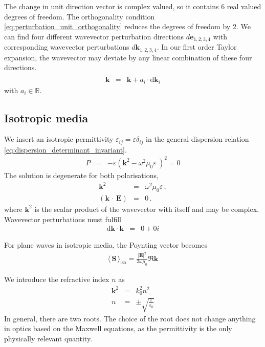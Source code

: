 \documentclass[12pt,a4paper,twoside,openright,BCOR10mm,headsepline,titlepage,abstracton,chapterprefix,final]{scrreprt}
\newcommand\Vector[1]{{\mathbf{#1}}}
\newcommand\vacuum{0}
\newcommand\wavenumber{k}
\newcommand\Wavevector{\Vector{\wavenumber}}
\newcommand{\scpm}[2]{(#1\,\cdot\,#2)}
\newcommand\scalarEfield{E}
\newcommand\Efield{\Vector{\scalarEfield}}
\newcommand\vacuumpermeability{\scalarpermeability_{\vacuum}}
\newcommand\scalarpermeability{\mu}
\newcommand\vacuumpermittivity{\scalarpermittivity_{\vacuum}}
\newcommand\scalarpermittivity{\varepsilon}
\newcommand{\timeavg}[1]{{\langle\,#1\,\rangle}}
\renewcommand\d{\textrm{d}}
\begin{document}
The change in unit direction vector is complex valued, so it contains 6 real valued degrees of freedom.
The orthogonality condition \eqref{eq:perturbation_unit_orthogonality} reduces the degrees of freedom by 2.
We can find four different wavevector perturbation directions $d\Vector{e}_{1,2,3,4}$
with corresponding wavevector perturbations $d \Wavevector_{1,2,3,4}$.
In our first order Taylor expansion, the wavevector may deviate by any linear combination of these four directions.
\begin{eqnarray}
 \tilde{\Wavevector} &=& \Wavevector + a_i \cdot \d \Wavevector_i \label{eq:perturbed_wavevector}
\end{eqnarray}
with $a_i \in \mathbb{R}$.


\subsection{Isotropic media}
We insert an isotropic permittivity $\scalarpermittivity_{ij} = \scalarpermittivity \delta_{ij}$ 
in the general dispersion relation \eqref{eq:dispersion_determinant_invariant}.
\begin{eqnarray}
 P &=& -\scalarpermittivity 
       \left( 
         \Wavevector^2 - \omega^2 \vacuumpermeability \scalarpermittivity\
       \right)^2
    = 0
\end{eqnarray}
The solution is degenerate for both polarisations,
\begin{eqnarray}
 \Wavevector^2 &=& \omega^2 \vacuumpermeability \scalarpermittivity\,, \\
 \scpm{\Wavevector}{\Efield} &=& 0\,.
\end{eqnarray}
where $\Wavevector^2$ is the scalar product of the wavevector with itself and may be complex.
Wavevector perturbations must fulfill
\begin{eqnarray}
 \d\Wavevector \cdot \Wavevector &=& 0 + 0i
\end{eqnarray}

For plane waves in isotropic media, the Poynting vector becomes 
\begin{eqnarray}
 \timeavg{\Vector{S}}_\text{iso} = \frac{ |\Efield|^2 }{ 2\omega\vacuumpermeability } \Re \Wavevector
\end{eqnarray}

We introduce the refractive index $n$ as
\begin{eqnarray}
 \Wavevector^2 &=& k_0^2 n^2 \\
 n &=& \pm \sqrt{ \frac{\scalarpermittivity}{\vacuumpermittivity} }
\end{eqnarray}
In general, there are two roots. 
The choice of the root does not change anything in optics based on the Maxwell equations, as the permittivity is the only physically relevant quantity.
\end{document}
